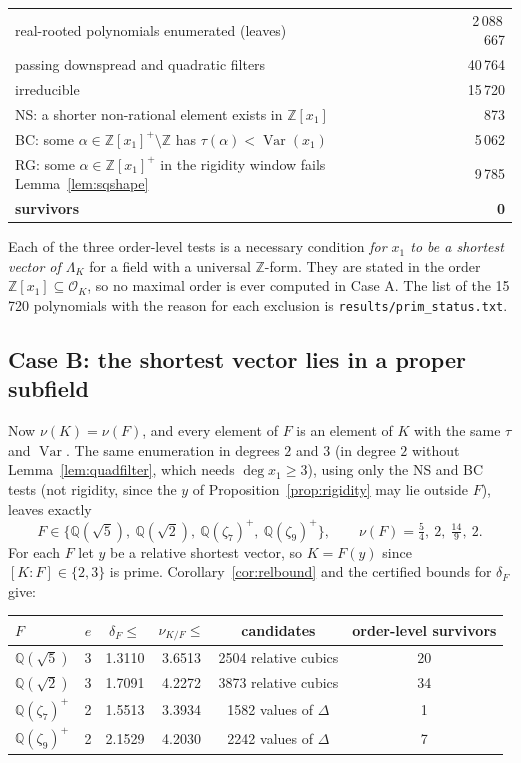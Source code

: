 \documentclass[11pt]{amsart}
\theoremstyle{definition}
\DeclareMathOperator{\Var}{Var}
\newcommand{\OK}{\mathcal{O}_K}
\newcommand{\Q}{\mathbb{Q}}
\newcommand{\Z}{\mathbb{Z}}
\newcommand{\LamK}{\Lambda_K}
\newcommand{\nurel}{\nu_{K/F}}
\newcommand{\file}[1]{\texttt{#1}}
\begin{document}
\begin{center}
\begin{tabular}{lr}
\toprule
real-rooted polynomials enumerated (leaves)& 2\,088\,667\\
passing downspread and quadratic filters & 40\,764\\
irreducible & 15\,720\\
\midrule
NS: a shorter non-rational element exists in $\Z[x_1]$ & 873\\
BC: some $\alpha\in\Z[x_1]^+\setminus\Z$ has $\tau(\alpha)<\Var(x_1)$ & 5\,062\\
RG: some $\alpha\in\Z[x_1]^+$ in the rigidity window fails Lemma~\ref{lem:sqshape} & 9\,785\\
\textbf{survivors} & \textbf{0}\\
\bottomrule
\end{tabular}
\end{center}

Each of the three order-level tests is a necessary condition \emph{for $x_1$ to be a shortest
vector of $\LamK$} for a field with a universal $\Z$-form.  They are stated in the order
$\Z[x_1]\subseteq\OK$, so no maximal order is ever computed in Case A.  The list of the
15\,720 polynomials with the reason for each exclusion is \file{results/prim\_status.txt}.

\subsection{Case B: the shortest vector lies in a proper subfield}\label{sec:caseB}
Now $\nu(K)=\nu(F)$, and every element of $F$ is an element of $K$ with the same $\tau$ and
$\Var$.  The same enumeration in degrees $2$ and $3$ (in degree $2$ without
Lemma~\ref{lem:quadfilter}, which needs $\deg x_1\ge3$), using only the NS and BC tests (not
rigidity, since the $y$ of Proposition~\ref{prop:rigidity} may lie outside $F$), leaves
exactly
\[
F\in\{\Q(\sqrt5),\ \Q(\sqrt2),\ \Q(\zeta_7)^+,\ \Q(\zeta_9)^+\},
\qquad \nu(F)=\tfrac54,\ 2,\ \tfrac{14}9,\ 2 .
\]
For each $F$ let $y$ be a relative shortest vector, so $K=F(y)$ since $[K:F]\in\{2,3\}$ is
prime.  Corollary~\ref{cor:relbound} and the certified bounds for $\delta_F$ give:

\begin{center}
\begin{tabular}{lccccc}
\toprule
$F$ & $e$ & $\delta_F\le$ & $\nurel\le$ & candidates & order-level survivors\\
\midrule
$\Q(\sqrt5)$ & 3 & 1.3110 & 3.6513 & 2504 relative cubics & 20\\
$\Q(\sqrt2)$ & 3 & 1.7091 & 4.2272 & 3873 relative cubics & 34\\
$\Q(\zeta_7)^+$ & 2 & 1.5513 & 3.3934 & 1582 values of $\Delta$ & 1\\
$\Q(\zeta_9)^+$ & 2 & 2.1529 & 4.2030 & 2242 values of $\Delta$ & 7\\
\bottomrule
\end{tabular}
\end{center}
\end{document}
